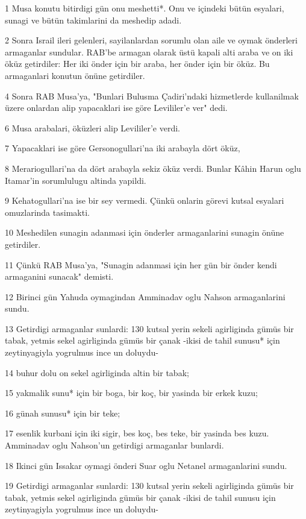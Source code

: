 \par 1 Musa konutu bitirdigi gün onu meshetti*. Onu ve içindeki bütün esyalari, sunagi ve bütün takimlarini da meshedip adadi.
\par 2 Sonra Israil ileri gelenleri, sayilanlardan sorumlu olan aile ve oymak önderleri armaganlar sundular. RAB'be armagan olarak üstü kapali alti araba ve on iki öküz getirdiler: Her iki önder için bir araba, her önder için bir öküz. Bu armaganlari konutun önüne getirdiler.
\par 4 Sonra RAB Musa'ya, "Bunlari Bulusma Çadiri'ndaki hizmetlerde kullanilmak üzere onlardan alip yapacaklari ise göre Levililer'e ver" dedi.
\par 6 Musa arabalari, öküzleri alip Levililer'e verdi.
\par 7 Yapacaklari ise göre Gersonogullari'na iki arabayla dört öküz,
\par 8 Merariogullari'na da dört arabayla sekiz öküz verdi. Bunlar Kâhin Harun oglu Itamar'in sorumlulugu altinda yapildi.
\par 9 Kehatogullari'na ise bir sey vermedi. Çünkü onlarin görevi kutsal esyalari omuzlarinda tasimakti.
\par 10 Meshedilen sunagin adanmasi için önderler armaganlarini sunagin önüne getirdiler.
\par 11 Çünkü RAB Musa'ya, "Sunagin adanmasi için her gün bir önder kendi armaganini sunacak" demisti.
\par 12 Birinci gün Yahuda oymagindan Amminadav oglu Nahson armaganlarini sundu.
\par 13 Getirdigi armaganlar sunlardi: 130 kutsal yerin sekeli agirliginda gümüs bir tabak, yetmis sekel agirliginda gümüs bir çanak -ikisi de tahil sunusu* için zeytinyagiyla yogrulmus ince un doluydu-
\par 14 buhur dolu on sekel agirliginda altin bir tabak;
\par 15 yakmalik sunu* için bir boga, bir koç, bir yasinda bir erkek kuzu;
\par 16 günah sunusu* için bir teke;
\par 17 esenlik kurbani için iki sigir, bes koç, bes teke, bir yasinda bes kuzu. Amminadav oglu Nahson'un getirdigi armaganlar bunlardi.
\par 18 Ikinci gün Issakar oymagi önderi Suar oglu Netanel armaganlarini sundu.
\par 19 Getirdigi armaganlar sunlardi: 130 kutsal yerin sekeli agirliginda gümüs bir tabak, yetmis sekel agirliginda gümüs bir çanak -ikisi de tahil sunusu için zeytinyagiyla yogrulmus ince un doluydu-

